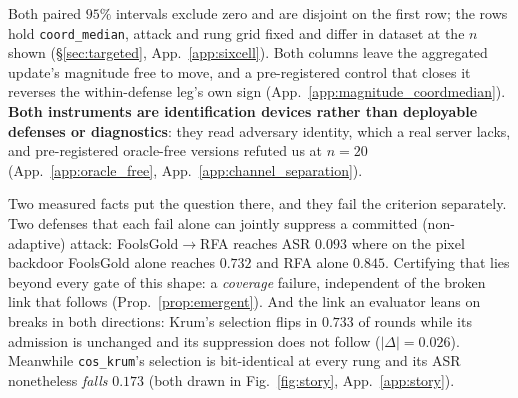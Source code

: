 \documentclass{article}
\begin{document}
\noindent Both paired $95\%$ intervals exclude zero and are disjoint on the first row; the rows hold \texttt{coord\_median}, attack and rung grid fixed and differ in dataset at the $n$ shown (§\ref{sec:targeted}, App.~\ref{app:sixcell}). Both columns leave the aggregated update's magnitude free to move, and a pre-registered control that closes it reverses the within-defense leg's own sign (App.~\ref{app:magnitude_coordmedian}). \textbf{Both instruments are identification devices rather than deployable defenses or diagnostics}: they read adversary identity, which a real server lacks, and pre-registered oracle-free versions refuted us at $n{=}20$ (App.~\ref{app:oracle_free}, App.~\ref{app:channel_separation}).

\noindent Two measured facts put the question there, and they fail the criterion separately. Two defenses that each fail alone can jointly suppress a committed (non-adaptive) attack: FoolsGold$\to$RFA reaches ASR $0.093$ where on the pixel backdoor FoolsGold alone reaches $0.732$ and RFA alone $0.845$. Certifying that lies beyond every gate of this shape: a \emph{coverage} failure, independent of the broken link that follows (Prop.~\ref{prop:emergent}). And the link an evaluator leans on breaks in both directions: Krum's selection flips in $0.733$ of rounds while its admission is unchanged and its suppression does not follow ($|\Delta|{=}0.026$). Meanwhile \texttt{cos\_krum}'s selection is bit-identical at every rung and its ASR nonetheless \emph{falls} $0.173$ (both drawn in Fig.~\ref{fig:story}, App.~\ref{app:story}).
\end{document}
